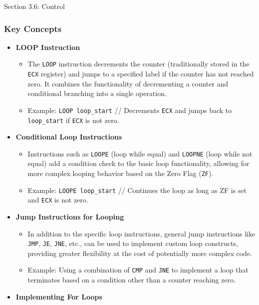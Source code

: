 \begin{notes}{Section 3.6: Control}
    \subsubsection*{Key Concepts}
    
    \begin{itemize}
        \item \textbf{LOOP Instruction}
        \begin{itemize}
            \item The \texttt{LOOP} instruction decrements the counter (traditionally stored in the \texttt{ECX} register) and jumps to a specified label if the counter has not reached zero. It 
            combines the functionality of decrementing a counter and conditional branching into a single operation.
            \item Example: \texttt{LOOP loop\_start} // Decrements \texttt{ECX} and jumps back to \texttt{loop\_start} if \texttt{ECX} is not zero.
        \end{itemize}
        \item \textbf{Conditional Loop Instructions}
        \begin{itemize}
            \item Instructions such as \texttt{LOOPE} (loop while equal) and \texttt{LOOPNE} (loop while not equal) add a condition check to the basic loop functionality, allowing for more complex 
            looping behavior based on the Zero Flag (\texttt{ZF}).
            \item Example: \texttt{LOOPE loop\_start} // Continues the loop as long as ZF is set and \texttt{ECX} is not zero.
        \end{itemize}
        \item \textbf{Jump Instructions for Looping}
        \begin{itemize}
            \item In addition to the specific loop instructions, general jump instructions like \texttt{JMP}, \texttt{JE}, \texttt{JNE}, etc., can be used to implement custom loop constructs, providing 
            greater flexibility at the cost of potentially more complex code.
            \item Example: Using a combination of \texttt{CMP} and \texttt{JNE} to implement a loop that terminates based on a condition other than a counter reaching zero.
        \end{itemize}
        \item \textbf{Implementing For Loops}
        \begin{itemize}

\end{itemize}
\end{itemize}
\end{notes}
